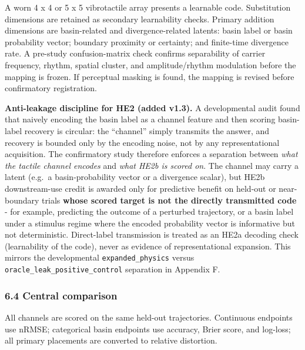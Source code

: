 \documentclass[
  11pt,
]{article}
\begin{document}
A worn 4 x 4 or 5 x 5 vibrotactile array presents a
learnable code. Substitution dimensions are retained as
secondary learnability checks. Primary addition
dimensions are basin-related and divergence-related
latents: basin label or basin probability vector;
boundary proximity or certainty; and finite-time
divergence rate. A pre-study confusion-matrix check
confirms separability of carrier frequency, rhythm,
spatial cluster, and amplitude/rhythm modulation before
the mapping is frozen. If perceptual masking is found,
the mapping is revised before confirmatory
registration.

\textbf{Anti-leakage discipline for HE2 (added v1.3).}
A developmental audit found that naively encoding the
basin label as a channel feature and then scoring
basin-label recovery is circular: the ``channel''
simply transmits the answer, and recovery is bounded
only by the encoding noise, not by any representational
acquisition. The confirmatory study therefore enforces
a separation between \emph{what the tactile channel
encodes} and \emph{what HE2b is scored on}. The channel
may carry a latent (e.g.~a basin-probability vector or
a divergence scalar), but HE2b downstream-use credit is
awarded only for predictive benefit on held-out or
near-boundary trials \textbf{whose scored target is not
the directly transmitted code} - for example,
predicting the outcome of a perturbed trajectory, or a
basin label under a stimulus regime where the encoded
probability vector is informative but not
deterministic. Direct-label transmission is treated as
an HE2a decoding check (learnability of the code),
never as evidence of representational expansion. This
mirrors the developmental \texttt{expanded\_physics}
versus \texttt{oracle\_leak\_positive\_control}
separation in Appendix F.

\subsubsection{6.4 Central
comparison}\label{central-comparison}

All channels are scored on the same held-out
trajectories. Continuous endpoints use nRMSE;
categorical basin endpoints use accuracy, Brier score,
and log-loss; all primary placements are converted to
relative distortion.
\end{document}
